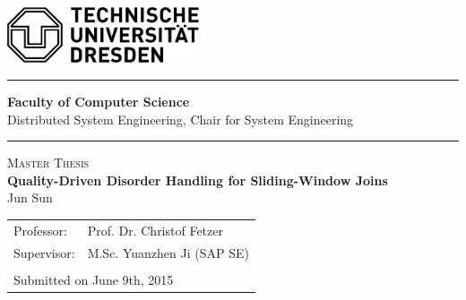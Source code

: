 \documentclass[a4paper, 11pt, twoside]{report}
\begin{document}
\thispagestyle{empty}

\begin{flushleft}
	\includegraphics[height=1.65cm]{tu.pdf}
\end{flushleft}

\parindent0pt
\rule{140mm}{0.3mm}
\newline
\textbf{Faculty of Computer Science}\\ Distributed System Engineering, Chair for System Engineering
\newline
\rule[2.5mm]{140mm}{0.3mm}

\begin{center}
	\vspace{2cm}
	\Large
	\textsc{Master Thesis}\\
	
	\vspace{1cm}
	\LARGE
	\textbf{Quality-Driven Disorder Handling for Sliding-Window Joins}\\
	\vspace{2cm}
	\Large
	Jun Sun\\
\end{center}

\begin{flushleft}
	\vspace{4cm}
	\begin{tabular}{ll}
	Professor:  & Prof. Dr.  Christof Fetzer\\
	Supervisor: & M.Sc. Yuanzhen Ji (SAP SE) \\
	\\
	\multicolumn{2}{l}{Submitted on  June 9th, 2015} \\
	\end{tabular}
\end{flushleft}
\cleardoublepage


\cleardoublepage



\cleardoublepage
\end{document}
